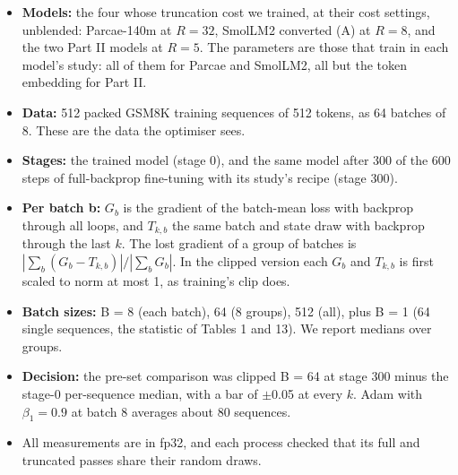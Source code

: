 \documentclass[10pt]{article}
\begin{document}
\begin{itemize}
\item \textbf{Models:} the four whose truncation cost we trained, at their cost settings, unblended: Parcae-140m at $R = 32$, SmolLM2 converted (A) at $R = 8$, and the two Part II models at $R = 5$. The parameters are those that train in each model's study: all of them for Parcae and SmolLM2, all but the token embedding for Part II.
\item \textbf{Data:} 512 packed GSM8K training sequences of 512 tokens, as 64 batches of 8. These are the data the optimiser sees.
\item \textbf{Stages:} the trained model (stage 0), and the same model after 300 of the 600 steps of full-backprop fine-tuning with its study's recipe (stage 300).
\item \textbf{Per batch b:} $G_b$ is the gradient of the batch-mean loss with backprop through all loops, and $T_{k,b}$ the same batch and state draw with backprop through the last $k$. The lost gradient of a group of batches is $|\sum_b (G_b - T_{k,b})| / |\sum_b G_b|$. In the clipped version each $G_b$ and $T_{k,b}$ is first scaled to norm at most 1, as training's clip does.
\item \textbf{Batch sizes:} B = 8 (each batch), 64 (8 groups), 512 (all), plus B = 1 (64 single sequences, the statistic of Tables 1 and 13). We report medians over groups.
\item \textbf{Decision:} the pre-set comparison was clipped B = 64 at stage 300 minus the stage-0 per-sequence median, with a bar of $\pm$0.05 at every $k$. Adam with $\beta_1 = 0.9$ at batch 8 averages about 80 sequences.
\item All measurements are in fp32, and each process checked that its full and truncated passes share their random draws.
\end{itemize}
\end{document}
